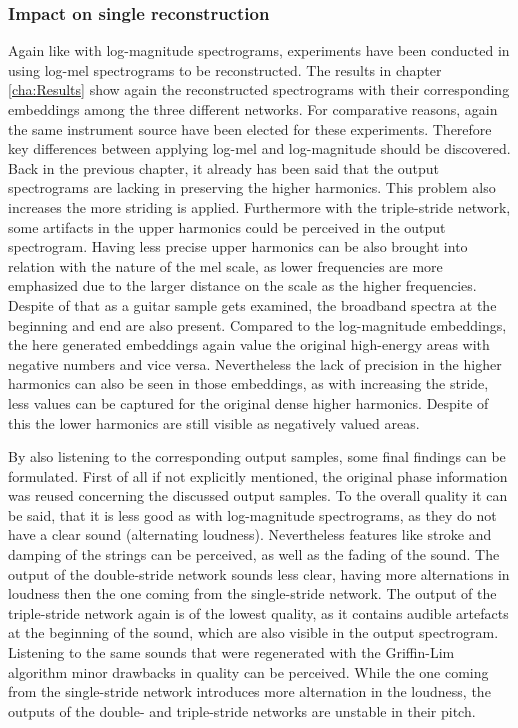 \subsubsection{Impact on single reconstruction}
Again like with log-magnitude spectrograms, experiments have been conducted in using log-mel spectrograms to be reconstructed. The results in chapter \ref{cha:Results} show again the reconstructed spectrograms with their corresponding embeddings among the three different networks. For comparative reasons, again the same instrument source have been elected for these experiments. Therefore key differences between applying log-mel and log-magnitude should be discovered. Back in the previous chapter, it already has been said that the output spectrograms are lacking in preserving the higher harmonics. This problem also increases the more striding is applied. Furthermore with the triple-stride network, some artifacts in the upper harmonics could be perceived in the output spectrogram. Having less precise upper harmonics can be also brought into relation with the nature of the mel scale, as lower frequencies are more emphasized due to the larger distance on the scale as the higher frequencies. Despite of that as a guitar sample gets examined, the broadband spectra at the beginning and end are also present. Compared to the log-magnitude embeddings, the here generated embeddings again value the original high-energy areas with negative numbers and vice versa. Nevertheless the lack of precision in the higher harmonics can also be seen in those embeddings, as with increasing the stride, less values can be captured for the original dense higher harmonics. Despite of this the lower harmonics are still visible as negatively valued areas. 

By also listening to the corresponding output samples, some final findings can be formulated. First of all if not explicitly mentioned, the original phase information was reused concerning the discussed output samples. To the overall quality it can be said, that it is less good as with log-magnitude spectrograms, as they do not have a clear sound (alternating loudness). Nevertheless features like stroke and damping of the strings can be perceived, as well as the fading of the sound. The output of the double-stride network sounds less clear, having more alternations in loudness then the one coming from the single-stride network. The output of the triple-stride network again is of the lowest quality, as it contains audible artefacts at the beginning of the sound, which are also visible in the output spectrogram. Listening to the same sounds that were regenerated with the Griffin-Lim algorithm minor drawbacks in quality can be perceived. While the one coming from the single-stride network introduces more alternation in the loudness, the outputs of the double- and triple-stride networks are unstable in their pitch. 

